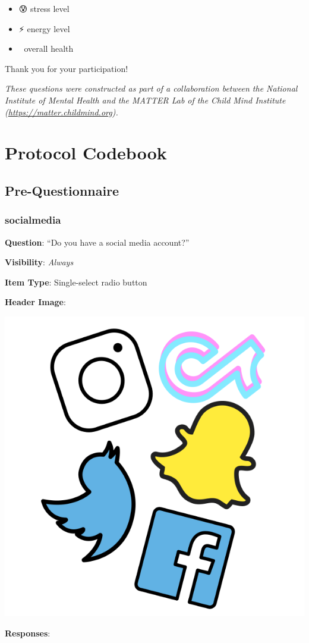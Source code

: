 \documentclass[]{book}
\providecommand{\tightlist}{%
  \setlength{\itemsep}{0pt}\setlength{\parskip}{0pt}}
\begin{document}
\begin{itemize}
\tightlist
\item
  😰 stress level
\item
  ⚡️ energy level
\item
  🏥 overall health
\end{itemize}

Thank you for your participation!

\emph{These questions were constructed as part of a collaboration between the National Institute of Mental Health and the MATTER Lab of the Child Mind Institute (\url{https://matter.childmind.org}).}

\hypertarget{part-protocol-codebook}{%
\part{Protocol Codebook}\label{part-protocol-codebook}}

\hypertarget{pre_section}{%
\chapter{Pre-Questionnaire}\label{pre_section}}

\hypertarget{socialmedia}{%
\section{socialmedia}\label{socialmedia}}

\textbf{Question}: ``Do you have a social media account?''

\textbf{Visibility}: \emph{Always}

\textbf{Item Type}: Single-select radio button

\textbf{Header Image}:

\begin{flushleft}\includegraphics[width=0.33\linewidth]{downloadFigs4latex_NIMH_Applet_Codebook/socialmedia_headerImg} \end{flushleft}

\textbf{Responses}:
\end{document}
